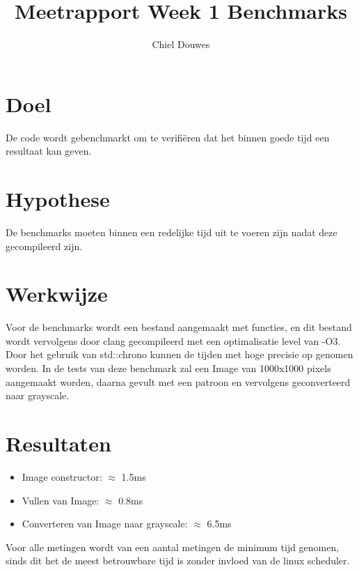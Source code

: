 \documentclass[11pt]{article}
\title{Meetrapport Week 1 Benchmarks}
\author{Chiel Douwes}
\begin{document}
    \maketitle


    \section{Doel}\label{sec:doel}
    De code wordt gebenchmarkt om te verifiëren dat het binnen goede tijd een resultaat kan geven.


    \section{Hypothese}\label{sec:hypothese}
    De benchmarks moeten binnen een redelijke tijd uit te voeren zijn nadat deze gecompileerd zijn.


    \section{Werkwijze}\label{sec:werkwijze}
    Voor de benchmarks wordt een bestand aangemaakt met functies, en dit bestand wordt vervolgens
    door clang gecompileerd met een optimalisatie level van -O3. Door het gebruik van std::chrono
    kunnen de tijden met hoge precisie op genomen worden.
    \linebreak
    In de tests van deze benchmark zal een Image van 1000x1000 pixels aangemaakt worden, daarna
    gevult met een patroon en vervolgens geconverteerd naar grayscale.


    \section{Resultaten}\label{sec:resultaten}
    \begin{itemize}
        \item Image constructor: $\approx$ 1.5ms
        \item Vullen van Image: $\approx$ 0.8ms
        \item Converteren van Image naar grayscale: $\approx$ 6.5ms
    \end{itemize}
    Voor alle metingen wordt van een aantal metingen de minimum tijd genomen, sinds dit het de
    meest betrouwbare tijd is zonder invloed van de linux scheduler.
\end{document}
